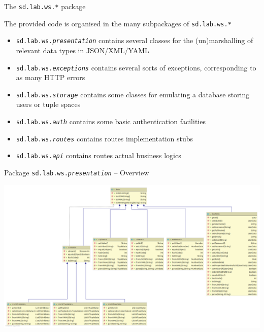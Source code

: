 \documentclass[presentation]{beamer}\mode<presentation>{\usetheme{AMSCesenaPurpleAndGold}}
\begin{document}
\begin{frame}{The \texttt{sd.lab.ws.*} package}
    
    The provided code is organised in the many subpackages of \texttt{sd.lab.ws.*}
    \vfill
    \begin{itemize}
        
        \item \alert{\texttt{sd.lab.ws.\textit{presentation}}} contains several classes for the \alert{(un)marshalling} of relevant data types in JSON/XML/YAML
        
        \vfill
        
        \item \alert{\texttt{sd.lab.ws.\textit{exceptions}}} contains several sorts of \alert{exceptions}, corresponding to as many HTTP errors
        
        \vfill
        
        \item \alert{\texttt{sd.lab.ws.\textit{storage}}} contains some classes for emulating a \alert{database} 
        storing users or tuple spaces
        
        \vfill
        
        \item \alert{\texttt{sd.lab.ws.\textit{auth}}} contains some basic \alert{authentication} facilities
        
        \vfill
        
        \item \alert{\texttt{sd.lab.ws.\textit{routes}}} contains routes implementation \alert{stubs}
        
        \vfill
        
        \item \alert{\texttt{sd.lab.ws.\textit{api}}} contains routes actual \alert{business logics}
    \end{itemize}
\end{frame}

\begin{frame}{Package \texttt{sd.lab.ws.\textit{presentation}} -- Overview}
    
    \centering
    \includegraphics[width=\linewidth]{img/pkg-presentation.png}
    
\end{frame}
\end{document}
